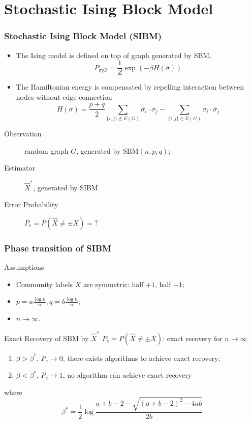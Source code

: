 \documentclass[notheorems]{beamer}
\begin{document}
\section{Stochastic Ising Block Model}
\frame{\tableofcontents[currentsection]}
\begin{frame}
\frametitle{Stochastic Ising Block Model (SIBM)}
\begin{itemize}
\item The Ising model is defined on top of graph generated by SBM.
\begin{equation*}
P_{\sigma | G} = \frac{1}{Z} \exp(-\beta H(\bar{\sigma}))
\end{equation*}
\item The Hamiltonian energy is compensated by repelling interaction between nodes without edge connection
\begin{equation*}
H(\sigma) = \frac{p+q}{2}\sum_{\{i,j\} \not\in E(G)} \sigma_i \cdot \sigma_j - \sum_{\{i,j\} \in E(G)} \sigma_i \cdot \sigma_j
\end{equation*}
\end{itemize}
\begin{description}
	\item[Observation] random graph $G$, generated by $\textrm{SBM}(n,p,q)$;
	\item[Estimator] $\hat{X}^*$, generated by SIBM
	\item[Error Probability] $P_e=P(\hat{X} \neq \pm X) = ?$
\end{description}
\end{frame}

\begin{frame}
\frametitle{Phase transition of SIBM}
\begin{block}{Assumptions}
	\begin{itemize}
		\item Community labels $X$ are symmetric: half $+1$, half $-1$;
		\item $p = a\frac{ \log n}{n}, q = b \frac{ \log n}{n}$;
		\item $n \to \infty$.
	\end{itemize}
\end{block}
\begin{block}{Exact Recovery of SBM by $\hat{X}^*$}
	$P_e=P(\hat{X} \neq \pm X)$: exact recovery for $n \to \infty$
\begin{enumerate}
	\item $\beta > \beta^*$, $P_e \to 0$, there exists algorithms to achieve exact recovery;
	\item $\beta < \beta^*$, $P_e \to 1$, no algorithm can achieve exact recovery
\end{enumerate}
where
\begin{equation*}
\beta^* = \frac{1}{2} \log \frac{a+b-2 - \sqrt{(a+b-2)^2-4ab}}{2b}
\end{equation*}
\end{block}

\end{frame}
\end{document}
